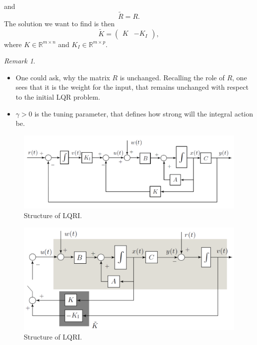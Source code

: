 \documentclass[a4paper,12 pt]{article}
\numberwithin{equation}{section}
\theoremstyle{definition}
\theoremstyle{remark}
\newtheorem*{bmk}{Remark}
\theoremstyle{definition}
\theoremstyle{definition}
\theoremstyle{definition}
\theoremstyle{remark}
\begin{document}
and
\begin{equation}
\tilde{R}=R.
\end{equation}
The solution we want to find is then
\begin{equation}
\tilde{K}=\begin{pmatrix} 
K&-K_I
\end{pmatrix},
\end{equation}
where $K\in \mathbb{R}^{m\times n}$ and $K_I\in \mathbb{R}^{m\times p}$.
\begin{bmk}
\
\begin{itemize}
\item One could ask, why the matrix $R$ is unchanged. Recalling the role of $R$, one sees that it is the weight for the input, that remains unchanged with respect to the initial LQR problem. 
\item $\gamma >0$ is the tuning parameter, that defines how strong will the integral action be.
\end{itemize}
\end{bmk}




\begin{figure}[h]
\begin{center}\includegraphics[width=0.8\columnwidth]{LQRI1}\end{center}
\caption{Structure of LQRI.}
\label{fig:lqri1}
\end{figure}

\begin{figure}[h]
\begin{center}\includegraphics[width=0.7\columnwidth]{LQRI2}\end{center}
\caption{Structure of LQRI.}
\label{fig:lqri2}
\end{figure}
\end{document}
